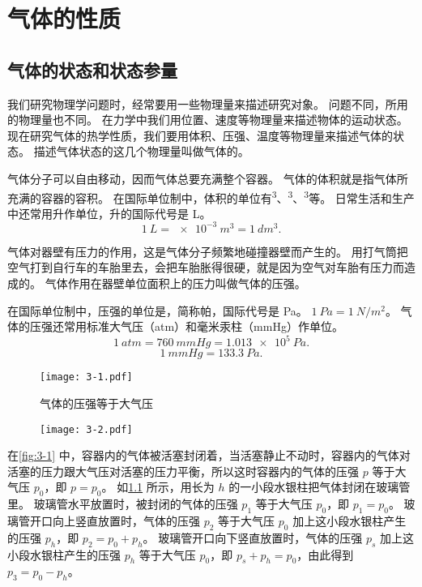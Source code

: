 \chapter{气体的性质}\label{chp:property_gas}
\section{气体的状态和状态参量}
我们研究物理学问题时，经常要用一些物理量来描述研究对象。
问题不同，所用的物理量也不同。
在力学中我们用位置、速度等物理量来描述物体的运动状态。
现在研究气体的热学性质，我们要用体积、压强、温度等物理量来描述气体的状态。
描述气体状态的这几个物理量叫做气体的。

气体分子可以自由移动，因而气体总要充满整个容器。
气体的体积就是指气体所充满的容器的容积。
在国际单位制中，体积的单位有\unit{^3}、\unit{^3}、\unit{^3}等。
日常生活和生产中还常用升作单位，升的国际代号是 \unit{L}。
\[\qty{1}{L}=\qty{e-3}{m^3}=\qty{1}{dm^3}.\]

气体对器壁有压力的作用，这是气体分子频繁地碰撞器壁而产生的。
用打气筒把空气打到自行车的车胎里去，会把车胎胀得很硬，就是因为空气对车胎有压力而造成的。
气体作用在器壁单位面积上的压力叫做气体的压强。

在国际单位制中，压强的单位是，简称帕，国际代号是 \unit{Pa}。
$\qty{1}{Pa}=\qty{1}{N/m^2}$。
气体的压强还常用标准大气压（\unit{atm}）和毫米汞柱（\unit{mmHg}）作单位。
\[\qty{1}{atm}=\qty{760}{mmHg} =\qty{1.013e5}{Pa}.\]
\[\qty{1}{mmHg}=\qty{133.3}{Pa}.\]

\begin{figure}
	\begin{minipage}[b]{0.4\linewidth}\centering
		\texttt{[image: 3-1.pdf]}
		\caption{气体的压强等于大气压}\label{fig:3-1}
	\end{minipage}
	\begin{minipage}[b]{0.58\linewidth}\centering
		\texttt{[image: 3-2.pdf]}
		\caption{}\label{fig:3-2}
	\end{minipage}
\end{figure}

在\cref{fig:3-1} 中，容器内的气体被活塞封闭着，当活塞静止不动时，容器内的气体对活塞的压力跟大气压对活塞的压力平衡，所以这时容器内的气体的压强 $p$ 等于大气压 $p_0$，即 $p=p_0$。
如\cref{fig:3-2} 所示，用长为 $h$ 的一小段水银柱把气体封闭在玻璃管里。
玻璃管水平放置时，被封闭的气体的压强 $p_1$ 等于大气压 $p_0$，即 $p_1=p_0$。
玻璃管开口向上竖直放置时，气体的压强 $p_2$ 等于大气压 $p_0$ 加上这小段水银柱产生的压强 $p_h$，即 $p_2=p_0+p_h$。
玻璃管开口向下竖直放置时，气体的压强 $p_s$ 加上这小段水银柱产生的压强 $p_h$ 等于大气压 $p_0$，即 $p_s+p_h=p_0$，由此得到 $p_3=p_0-p_h$。

